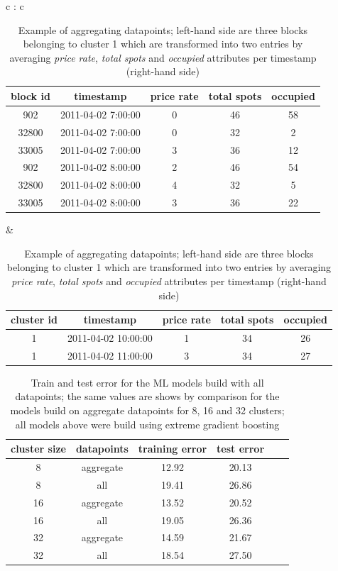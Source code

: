 {\begin{table}
{\color{green}
\footnotesize
\begin{tabular}{  c : c  }
		\begin{tabular}{ | c | c | c | c | c |}
			\hline
			\textbf{block id} & \textbf{timestamp} & \textbf{price rate} & \textbf{total spots} & \textbf{occupied} \\ \hline
			902 & {2011-04-02 7:00:00} & 0 & 46 & 58 \\ \hline
			32800 & {2011-04-02 7:00:00} & 0 & 32 & 2 \\ \hline
			33005 & {2011-04-02 7:00:00} & 3 & 36 & 12 \\ \hline
			902 & {2011-04-02 8:00:00} & 2 & 46 & 54 \\ \hline
			32800 & {2011-04-02 8:00:00} & 4 & 32 & 5 \\ \hline
			33005 & {2011-04-02 8:00:00} & 3 & 36 & 22 \\ \hline
		\end{tabular}
 & 
		\begin{tabular}{ | c | c | c | c | c |}
			\hline
			\textbf{cluster id} & \textbf{timestamp} & \textbf{price rate} & \textbf{total spots} & \textbf{occupied} \\ \hline
			1 & {2011-04-02 10:00:00} & 1 & 34 & 26 \\ \hline
			1 & {2011-04-02 11:00:00} & 3 & 34 & 27 \\ \hline
		\end{tabular}
\end{tabular}}
\caption{\color{green} Example of aggregating datapoints; left-hand side are three blocks belonging to cluster 1 which are transformed into two entries by averaging \textit{price rate}, \textit{total spots} and \textit{occupied} attributes per timestamp (right-hand side)}
\label{extensions:aggregating_datapoints}
\end{table}

\begin{table}[!ht]
	{\color{green}
	\centering
	\small
	\begin{tabular}{ | c | c | c | c | c | c | }
		\hline
		{cluster size} & datapoints & {training error} & {test error} \\ \hline
		8	&	aggregate &	12.92	&	20.13 \\ \hline
		8	&	all		&	19.41	&	26.86 \\ \hline
		16	&	aggregate	&	13.52	&	20.52 \\ \hline
		16	&	all		&	19.05	&	26.36 \\ \hline
		32	&	aggregate	&	14.59	&	21.67 \\ \hline
		32	&	all		&	18.54	&	27.50 \\ \hline
	\end{tabular}%
	\caption{\color{green} Train and test error for the ML models build with all datapoints; the same values are shows by comparison for the models build on aggregate datapoints for 8, 16 and 32 clusters; all models above were build using extreme gradient boosting}
	\label{extensions:train_test_errors}}
\end{table}


}
